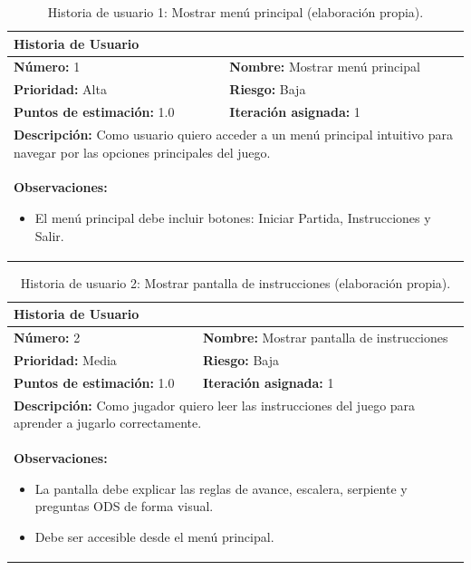 \begin{table}[H]
\centering
\caption{Historia de usuario 1: Mostrar menú principal (elaboración propia).\label{tab:hu1}}
\renewcommand{\arraystretch}{1.5}
\begin{tabular}{|p{}|p{}|}
\hline
\multicolumn{2}{|l|}{\textbf{Historia de Usuario}} \\
\hline
\textbf{Número:} 1 & \textbf{Nombre:} Mostrar menú principal \\
\hline
\textbf{Prioridad:} Alta & \textbf{Riesgo:} Baja \\
\hline
\textbf{Puntos de estimación:} 1.0 & \textbf{Iteración asignada:} 1 \\
\hline
\multicolumn{2}{|p{0.945\textwidth}|}{\textbf{Descripción:} Como usuario quiero acceder a un menú principal intuitivo para navegar por las opciones principales del juego.} \\
\hline
\multicolumn{2}{|p{0.945\textwidth}|}{\textbf{Observaciones:}
\vspace{-0.5em}
\begin{itemize}
    \setlength\itemsep{0em}
    \item El menú principal debe incluir botones: Iniciar Partida, Instrucciones y Salir.
\end{itemize}
\vspace{-1em}
} \\
\hline
\end{tabular}
\end{table}

\begin{table}[H]
\centering
\caption{Historia de usuario 2: Mostrar pantalla de instrucciones (elaboración propia).\label{tab:hu2}}
\renewcommand{\arraystretch}{1.5}
\begin{tabular}{|p{}|p{}|}
\hline
\multicolumn{2}{|l|}{\textbf{Historia de Usuario}} \\
\hline
\textbf{Número:} 2 & \textbf{Nombre:} Mostrar pantalla de instrucciones \\
\hline
\textbf{Prioridad:} Media & \textbf{Riesgo:} Baja \\
\hline
\textbf{Puntos de estimación:} 1.0 & \textbf{Iteración asignada:} 1 \\
\hline
\multicolumn{2}{|p{0.945\textwidth}|}{\textbf{Descripción:} Como jugador quiero leer las instrucciones del juego para aprender a jugarlo correctamente.} \\
\hline
\multicolumn{2}{|p{0.945\textwidth}|}{\textbf{Observaciones:}
\vspace{-0.5em}
\begin{itemize}
    \setlength\itemsep{0em}
    \item La pantalla debe explicar las reglas de avance, escalera, serpiente y preguntas ODS de forma visual.
    \item Debe ser accesible desde el menú principal.
\end{itemize}
\vspace{-1em}
} \\
\hline
\end{tabular}
\end{table}

